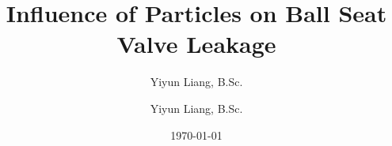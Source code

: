 \title{Influence of Particles on Ball Seat Valve Leakage}

\author{Yiyun Liang, B.Sc.}
\signature{Yiyun Liang, B.Sc.}
\date{\today}
\monat{\today}

